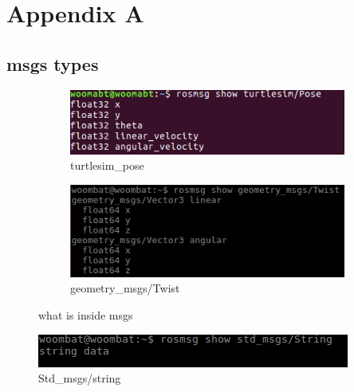 \chapter{Appendix A}\label{ch:appAlabel}
\section{msgs types}
\begin{figure}[h]
\centering
    \begin{subfigure}{.49\textwidth}
        \centering
        \includegraphics[width=\textwidth]{figures/turtlesim_pose.png}
        \caption{turtlesim\_pose}
        \label{fig:turtlesimPose} 
    \end{subfigure}
    \begin{subfigure}{.49\textwidth}
        \centering
        \includegraphics[width=\textwidth]{figures/geometry_msg.png} 
        \caption{geometry\_msgs/Twist}
        \label{fig:geometry\_msg\_Twist}
    \end{subfigure}
\caption{what is inside msgs}
\label{fig:whatisinside}
\end{figure}
\begin{figure}[h]
    \begin{center}
    \includegraphics[width=.55\textwidth]{figures/stdmsgs.png}
    \caption{Std\_msgs/string}
    \label{fig:stdmsgs}
    \end{center}
\end{figure}